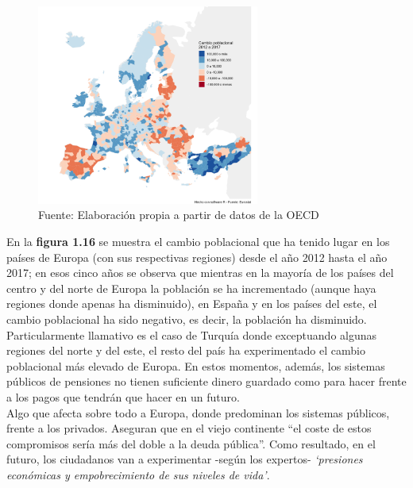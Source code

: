 \begin{figure}
\centering
\vspace{-1cm}
\hspace*{-2.5cm}\includegraphics[width=0.65\textwidth]{Cap1/eurostat.png}
\captionsetup{width=1.2\linewidth}
\caption{\label{fig:frog1}Fuente: Elaboraci\'on propia a partir de datos de la OECD} 
\end{figure}
En la \textbf{figura 1.16} se muestra el cambio poblacional que ha tenido lugar en los pa\'ises de Europa (con sus respectivas regiones) desde el a\~no 2012 hasta el a\~no 2017; en esos cinco a\~nos se observa que mientras en la mayor\'ia de los pa\'ises del centro y del norte de Europa la poblaci\'on se ha incrementado (aunque haya regiones donde apenas ha disminuido), en Espa\~na  y en los pa\'ises del este, el cambio poblacional ha sido negativo, es decir, la poblaci\'on ha disminuido. Particularmente llamativo es el caso de Turqu\'ia donde exceptuando algunas regiones del norte y del este, el resto del pa\'is ha experimentado el cambio poblacional m\'as elevado de Europa. En estos momentos, adem\'as, los sistemas p\'ublicos de pensiones no tienen suficiente dinero guardado como para hacer frente a los pagos que tendr\'an que hacer en un futuro.\\ 
Algo que afecta sobre todo a Europa, donde predominan los sistemas p\'ublicos, frente a los privados. Aseguran que en el viejo continente ``el coste de estos compromisos ser\'ia m\'as del doble a la deuda p\'ublica''. Como resultado, en el futuro, los ciudadanos van a experimentar -seg\'un los expertos- \textit{`presiones econ\'omicas y empobrecimiento de sus niveles de vida'}.

